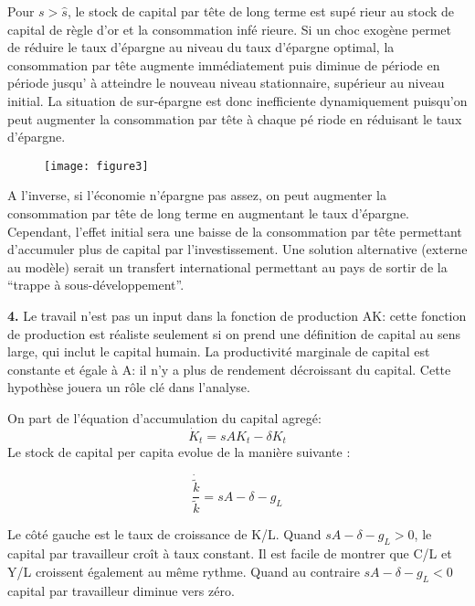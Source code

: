 \documentclass[11pt,a4paper]{article}
\begin{document}
Pour $s>\hat{s}$, le stock de capital par t\^{e}te de long terme est sup\'{e}%
rieur au stock de capital de r\`{e}gle d'or et la consommation inf\'{e}%
rieure. Si un choc exog\`{e}ne permet de r\'{e}duire le taux d'\'{e}pargne
au niveau du taux d'\'{e}pargne optimal, la consommation par t\^{e}te
augmente imm\'{e}diatement puis diminue de p\'{e}riode en p\'{e}riode jusqu'%
\`{a} atteindre le nouveau niveau stationnaire, sup\'{e}rieur au niveau
initial. La situation de sur-\'{e}pargne est donc inefficiente dynamiquement
puisqu'on peut augmenter la consommation par t\^{e}te \`{a} chaque p\'{e}%
riode en r\'{e}duisant le taux d'\'{e}pargne.

\begin{figure}[th]
\centering
\texttt{[image: figure3]}
\label{fig:1.4}
\end{figure}


A l'inverse, si l'\'economie n'\'epargne pas assez, on peut augmenter la
consommation par t\^ete de long terme en augmentant le taux d'\'epargne.
Cependant, l'effet initial sera une baisse de la consommation par t\^ete
permettant d'accumuler plus de capital par l'investissement. Une solution
alternative (externe au mod\`ele) serait un transfert international
permettant au pays de sortir de la ``trappe \`a sous-d\'eveloppement''.



\smallskip \noindent \textbf{4.}  Le travail n'est pas un input dans la fonction de production AK: cette fonction de production est r\'{e}aliste seulement si on prend une d\'{e}finition de capital au sens large, qui inclut le capital humain. La productivit\'{e}  marginale de capital est constante et \'{e}gale \`{a} A: il n'y a plus de rendement décroissant du capital. Cette hypoth\`ese jouera un rôle clé dans l'analyse.


On part de l'\'equation d'accumulation du capital agreg\'{e}: 
\begin{equation*}
\dot{K}_t=s AK_t -\delta K_t 
\end{equation*} Le stock de capital per capita evolue  de la manière suivante :

\begin{equation*}
\frac{\dot{\tilde{k}}}{\tilde{k}}=sA-\delta-g_L
\end{equation*}%


Le côté gauche est le taux de croissance de K/L. Quand $sA-\delta-g_L>0$, le capital par travailleur croît à taux constant. Il est facile de montrer que C/L et Y/L croissent également au même rythme. Quand au contraire $sA-\delta-g_L<0$ capital par travailleur diminue vers zéro.
\end{document}
